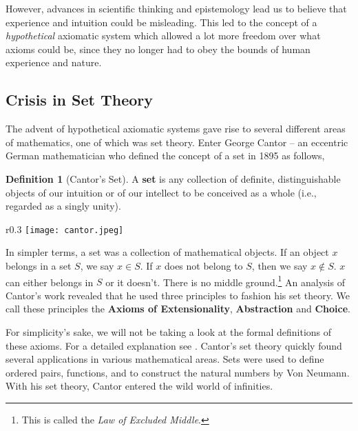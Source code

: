 \documentclass[a4paper, 12pt]{article}
\theoremstyle{definition}
\newtheorem{definition}{Definition}
\begin{document}
    However, advances in scientific thinking and 
    epistemology lead us to believe that experience and intuition could be misleading. This led to the concept of a 
    \textit{hypothetical} axiomatic system which allowed a lot more freedom over what axioms could be, since they no longer 
    had to obey the bounds of human experience and nature. 
  
    \subsection*{Crisis in Set Theory}
    
    The advent of hypothetical axiomatic systems gave rise to several different areas of mathematics, one of which was set theory. 
    Enter George Cantor -- an eccentric German mathematician who defined the concept of a set in 1895 as follows,
    \begin{definition}[Cantor's Set]
        A \textbf{set} is any collection of definite, distinguishable objects of our intuition or of our 
        intellect to be conceived as a whole (i.e., regarded as a singly unity).
    \end{definition}
    \vspace{-0.75 em}
    \begin{wrapfigure}{r}{0.3\textwidth}
        \vspace{-35pt}
        \centering 
        \texttt{[image: cantor.jpeg]}  
        \caption[Georg Cantor]{\textit{Georg Cantor}\footnotemark}
        \vspace{-10pt}
    \end{wrapfigure}
    In simpler terms, a set was a collection of mathematical objects. If an object $x$ belongs in a set $S$, we say 
    $x \in S$. If $x$ does not belong to $S$, then we say $x \notin S$. $x$ can either belongs in $S$ or it doesn't. There is no middle 
    ground.\footnote{This is called the \emph{Law of Excluded Middle}.} An analysis of Cantor's work revealed that he 
    used three principles to fashion his set theory. We call these principles the \textbf{Axioms of Extensionality}, \textbf{Abstraction} and \textbf{Choice}. 

    For simplicity's sake, we will not be taking a look at the formal definitions of these axioms. For a detailed 
    explanation see \cite{robic_foundations_2020}. Cantor's set theory quickly found several applications in various 
    mathematical areas. Sets were used to define ordered pairs, functions, and to construct the natural numbers by 
    Von Neumann. With his set theory, Cantor entered the wild world of infinities. 
    \vspace{-0.75 em}
\end{document}
